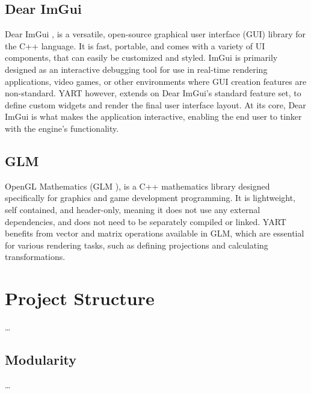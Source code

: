 \subsection{Dear ImGui}

Dear ImGui \supercite{DearImGui}, is a versatile, open-source graphical user interface (GUI) library for the C++ language. 
It is fast, portable, and comes with a variety of UI components, that can easily be customized and styled.
ImGui is primarily designed as an interactive debugging tool for use in real-time rendering applications, video games, or other environments where GUI creation features are non-standard.
YART however, extends on Dear ImGui's standard feature set, to define custom widgets and render the final user interface layout. 
At its core, Dear ImGui is what makes the application interactive, enabling the end user to tinker with the engine's functionality.

\subsection{GLM}

OpenGL Mathematics (GLM \supercite{GLM}), is a C++ mathematics library designed specifically for graphics and game development programming.
It is lightweight, self contained, and header-only, meaning it does not use any external dependencies, and does not need to be separately compiled or linked.
YART benefits from vector and matrix operations available in GLM, which are essential for various rendering tasks, such as defining projections and calculating transformations.

\section{Project Structure}

\dots

\subsection{Modularity}

\dots

